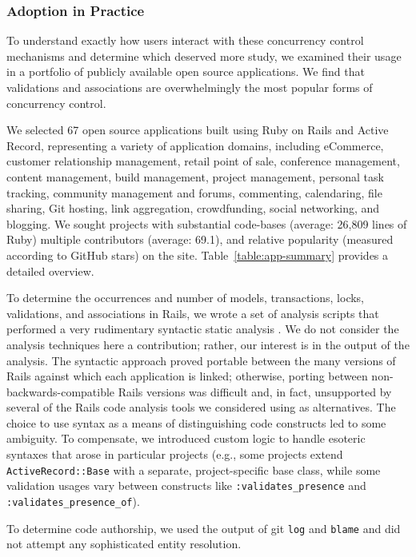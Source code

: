 \subsubsection{Adoption in Practice}

To understand exactly how users interact with these
concurrency control mechanisms and determine which deserved more
study, we examined their usage in a portfolio of publicly available
open source applications. We find that validations and associations
are overwhelmingly the most popular forms of concurrency control.

 We selected 67 open source applications
built using Ruby on Rails and Active Record, representing a variety of
application domains, including eCommerce, customer relationship
management, retail point of sale, conference management, content
management, build management, project management, personal task
tracking, community management and forums, commenting, calendaring,
file sharing, Git hosting, link aggregation, crowdfunding, social
networking, and blogging. We sought projects with substantial
code-bases (average: 26,809 lines of Ruby) multiple contributors
(average: 69.1), and relative popularity (measured according to GitHub
stars) on the site. Table~\ref{table:app-summary} provides a detailed overview.

To determine the occurrences and number of models, transactions, locks, validations, and associations in Rails, we wrote a set of analysis scripts that performed a very rudimentary syntactic static analysis . We do not consider the analysis techniques here a contribution; rather, our interest is in the output of the analysis. The syntactic approach proved portable between the many versions of Rails against which each application is linked; otherwise, porting between non-backwards-compatible Rails versions was difficult and, in fact, unsupported by several of the Rails code analysis tools we considered using as alternatives. The choice to use syntax as a means of distinguishing code constructs led to some ambiguity. To compensate, we introduced custom logic to handle esoteric syntaxes that arose in particular projects (e.g., some projects extend \texttt{ActiveRecord::Base} with a separate, project-specific base class, while some validation usages vary between constructs like \texttt{:validates\_presence} and \texttt{:validates\_presence\_of}).

To determine code authorship, we used the output of git \texttt{log} and \texttt{blame} and did not attempt any sophisticated entity resolution.



